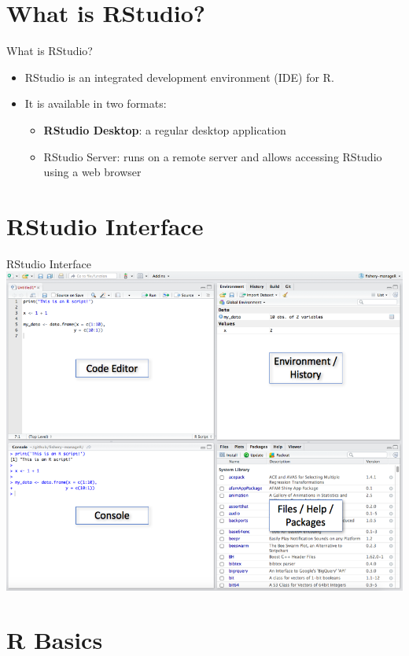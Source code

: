 \documentclass{beamer}
\begin{document}
\section{What is RStudio?}

\begin{frame}{What is RStudio?}
    \begin{itemize}
        \item RStudio is an integrated development environment (IDE) for R.
        \item It is available in two formats:
        \begin{itemize}
            \item \textbf{RStudio Desktop}: a regular desktop application
            \item RStudio Server: runs on a remote server and allows accessing RStudio using a web browser
        \end{itemize}
    \end{itemize}
\end{frame}

\section{RStudio Interface}

\begin{frame}{RStudio Interface}
    \includegraphics[scale = 0.425]{rstudio_ide_1.png}
\end{frame}

\section{R Basics}
\end{document}
